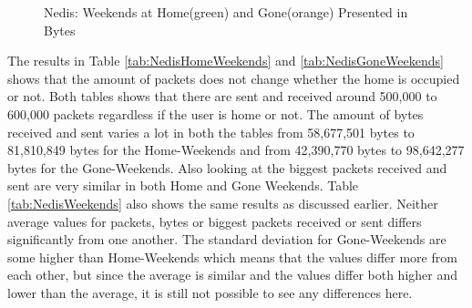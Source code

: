 \begin{figure}[H]
    \begin{subfigure}[b]{0.47\textwidth}
    \end{subfigure}
    \begin{subfigure}[b]{0.47\textwidth}
    \end{subfigure}
   \begin{subfigure}[b]{0.47\textwidth}
    \end{subfigure}
    \hspace{0.6cm}
    \begin{subfigure}[b]{0.47\textwidth}
    \end{subfigure}
    \caption{Nedis: Weekends at Home(green) and Gone(orange) Presented in Bytes}
    \label{fig:NedisWeekendBytes}
\end{figure}

The results in Table \ref{tab:NedisHomeWeekends} and \ref{tab:NedisGoneWeekends} shows that the amount of packets does not change whether the home is occupied or not. Both tables shows that there are sent and received around 500,000 to 600,000 packets regardless if the user is home or not. The amount of bytes received and sent varies a lot in both the tables from 58,677,501 bytes to 81,810,849 bytes for the Home-Weekends and from 42,390,770 bytes to 98,642,277 bytes for the Gone-Weekends. Also looking at the biggest packets received and sent are very similar in both Home and Gone Weekends. Table \ref{tab:NedisWeekends} also shows the same results as discussed earlier. Neither average values for packets, bytes or biggest packets received or sent differs significantly from one another. The standard deviation for Gone-Weekends are some higher than Home-Weekends which means that the values differ more from each other, but since the average is similar and the values differ both higher and lower than the average, it is still not possible to see any differences here.  